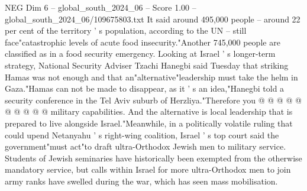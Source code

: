 \begin{textsample}{NEG Dim 6 – global\_south\_2024\_06 – Score 1.00 – global\_south\_2024\_06/109675803.txt}
It said around 495,000 people -- around 22 per cent of the territory ' s population, according to the UN -- still face"catastrophic levels of acute food insecurity."Another 745,000 people are classified as in a food security emergency.
Looking at Israel ' s longer-term strategy, National Security Adviser Tzachi Hanegbi said Tuesday that striking Hamas was not enough and that an"alternative"leadership must take the helm in Gaza."Hamas can not be made to disappear, as it ' s an idea,"Hanegbi told a security conference in the Tel Aviv suburb of Herzliya."Therefore you @ @ @ @ @ @ @ @ @ @ military capabilities.
And the alternative is local leadership that is prepared to live alongside Israel."Meanwhile, in a politically volatile ruling that could upend Netanyahu ' s right-wing coalition, Israel ' s top court said the government"must act"to draft ultra-Orthodox Jewish men to military service.
Students of Jewish seminaries have historically been exempted from the otherwise mandatory service, but calls within Israel for more ultra-Orthodox men to join army ranks have swelled during the war, which has seen mass mobilisation.

\end{textsample}
